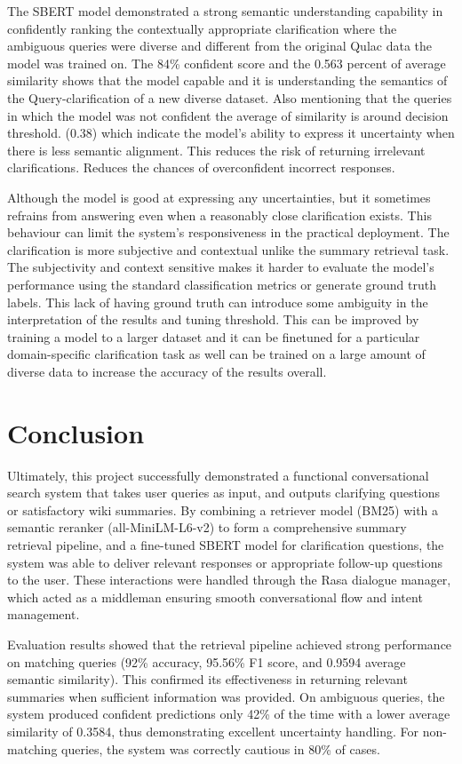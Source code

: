 \documentclass[11pt]{article}
\begin{document}
The SBERT model demonstrated a strong semantic understanding capability in confidently ranking the contextually appropriate clarification where the ambiguous queries were diverse and different from the original Qulac data the model was trained on. The 84\% confident score and the 0.563 percent of average similarity shows that the model capable and it is understanding the semantics of the Query-clarification of a new diverse dataset. Also mentioning that the queries in which the model was not confident the average of similarity is around decision threshold. (0.38) which indicate the model's ability to express it uncertainty when there is less semantic alignment. This reduces the risk of returning irrelevant clarifications.  Reduces the chances of overconfident incorrect responses.

Although the model is good at expressing any uncertainties, but it sometimes refrains from answering even when a reasonably close clarification exists.  This behaviour can limit the system's responsiveness in the practical deployment.
The clarification is more subjective and contextual unlike the summary retrieval task. The subjectivity and context sensitive makes it harder to evaluate the model's performance using the standard classification metrics or generate ground truth labels. This lack of having ground truth can introduce some ambiguity in the interpretation of the results and tuning threshold.  This can be improved by training a model to a larger dataset and it can be finetuned for a particular domain-specific clarification task as well can be trained on a large amount of diverse data to increase the accuracy of the results overall.


\section{Conclusion}
Ultimately, this project successfully demonstrated a functional conversational search system that takes user queries as input, and outputs clarifying questions or satisfactory wiki summaries. By combining a retriever model (BM25) with a semantic reranker (all-MiniLM-L6-v2) to form a comprehensive summary retrieval pipeline, and a fine-tuned SBERT model for clarification questions, the system was able to deliver relevant responses or appropriate follow-up questions to the user. These interactions were handled through the Rasa dialogue manager, which acted as a middleman ensuring smooth conversational flow and intent management.

Evaluation results showed that the retrieval pipeline achieved strong performance on matching queries (92\% accuracy, 95.56\% F1 score, and 0.9594 average semantic similarity). This confirmed its effectiveness in returning relevant summaries when sufficient information was provided. On ambiguous queries, the system produced confident predictions only 42\% of the time with a lower average similarity of 0.3584, thus demonstrating excellent uncertainty handling. For non-matching queries, the system was correctly cautious in 80\% of cases.
\end{document}
